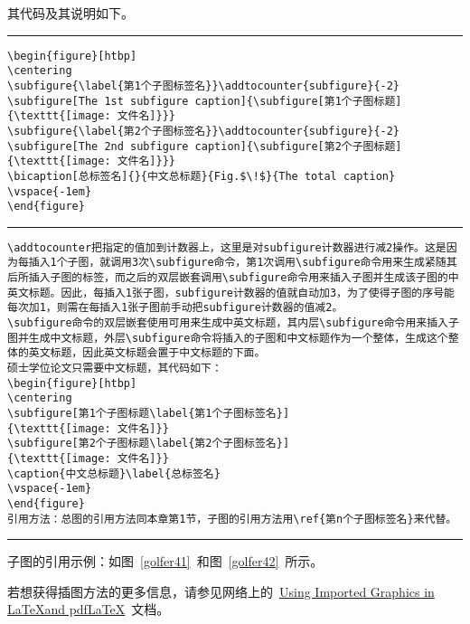 其代码及其说明如下。
\vspace{1em}\noindent\hrule
\begin{lstlisting}
\begin{figure}[htbp]
\centering
\subfigure{\label{第1个子图标签名}}\addtocounter{subfigure}{-2}
\subfigure[The 1st subfigure caption]{\subfigure[第1个子图标题]
{\texttt{[image: 文件名]}}}
\subfigure{\label{第2个子图标签名}}\addtocounter{subfigure}{-2}
\subfigure[The 2nd subfigure caption]{\subfigure[第2个子图标题]
{\texttt{[image: 文件名]}}}
\bicaption[总标签名]{}{中文总标题}{Fig.$\!$}{The total caption}
\vspace{-1em}
\end{figure}
\end{lstlisting}
\noindent\hrule
\begin{lstlisting}
\addtocounter把指定的值加到计数器上，这里是对subfigure计数器进行减2操作。这是因为每插入1个子图，就调用3次\subfigure命令，第1次调用\subfigure命令用来生成紧随其后所插入子图的标签，而之后的双层嵌套调用\subfigure命令用来插入子图并生成该子图的中英文标题。因此，每插入1张子图，subfigure计数器的值就自动加3，为了使得子图的序号能每次加1，则需在每插入1张子图前手动把subfigure计数器的值减2。
\subfigure命令的双层嵌套使用可用来生成中英文标题，其内层\subfigure命令用来插入子图并生成中文标题，外层\subfigure命令将插入的子图和中文标题作为一个整体，生成这个整体的英文标题，因此英文标题会置于中文标题的下面。
硕士学位论文只需要中文标题，其代码如下：
\begin{figure}[htbp]
\centering
\subfigure[第1个子图标题\label{第1个子图标签名}]
{\texttt{[image: 文件名]}}
\subfigure[第2个子图标题\label{第2个子图标签名}]
{\texttt{[image: 文件名]}}
\caption{中文总标题}\label{总标签名}
\vspace{-1em}
\end{figure}
引用方法：总图的引用方法同本章第1节，子图的引用方法用\ref{第n个子图标签名}来代替。
\end{lstlisting}
\noindent\hrule\vspace{1em}

子图的引用示例：如图~\ref{golfer41}~和图~\ref{golfer42}~所示。

若想获得插图方法的更多信息，请参见网络上的~\href{ftp://ftp.tex.ac.uk/tex-archive/info/epslatex.pdf}{Using Imported Graphics in \LaTeX and pdf\LaTeX}~文档。 
